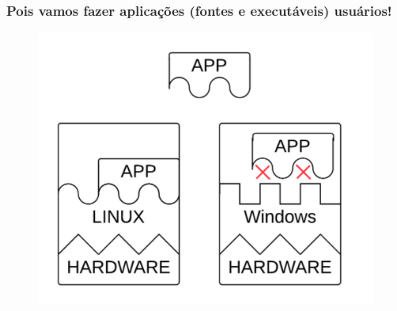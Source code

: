 \documentclass[10pt]{beamer}
\begin{document}
\begin{frame}[fragile]

\frametitle{Pois vamos fazer aplicações (fontes e executáveis) usuários!}

\begin{figure}[!ht]
\centering
\includegraphics[height =.65\textheight,width=.8\textwidth]
{figuras/aplicacao_usuario.png}
\end{figure}

\end{frame}
\end{document}
